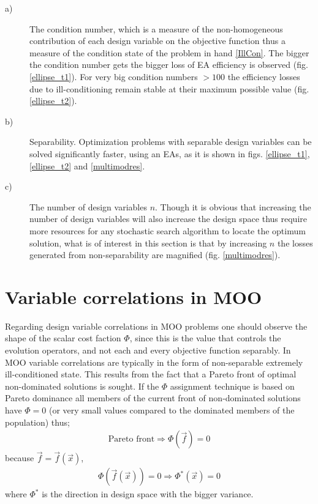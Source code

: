 \begin{description}
  \item[a)] The condition number, which is a measure of the non-homogeneous contribution of each design variable on the objective function thus a measure of the condition state of the problem in hand \ref{IllCon}. The bigger the condition number gets the bigger loss of EA efficiency is observed (fig. \ref{ellipse_t1}). For very big condition numbers $>100$ the efficiency losses due to ill-conditioning remain stable at their maximum possible value (fig. \ref{ellipse_t2}).    
  \item[b)] Separability. Optimization problems with separable design variables can be solved significantly faster, using an EAs, as it is shown in figs. \ref{ellipse_t1}, \ref{ellipse_t2} and \ref{multimodres}.  
  \item[c)] The number of design variables $n$. Though it is obvious that increasing the number of design variables will also increase the design space thus require more resources for any stochastic search algorithm to locate the optimum solution, what is of interest in this section is that by increasing $n$ the losses generated from non-separability are magnified (fig. \ref{multimodres}).  
\end{description}
\section{Variable correlations in MOO}
\label{VCMM}
Regarding design variable correlations in MOO problems one should observe the shape of the scalar cost faction $\Phi$, since this is the value that controls the evolution operators, and not each and every objective function separably. In MOO variable correlations are typically in the form of non-separable extremely ill-conditioned state. This results from the fact that a Pareto front of optimal non-dominated solutions is sought. If the $\Phi$ assignment technique is based on Pareto dominance all members of the current front of non-dominated solutions have $\Phi=0$ (or very small values compared to the dominated members of the population) thus;
\begin{eqnarray}
   \mbox{Pareto front} \Rightarrow 	\Phi(\vec{f})=0  
   \label{Corr-Par} 
\end{eqnarray}
because $\vec{f}=\vec{f}(\vec{x})$,
\begin{eqnarray}
	\Phi(\vec{f}(\vec{x}))=0 \Rightarrow \Phi^*(\vec{x})=0
    \label{Corr-Par2}
\end{eqnarray}
where $\Phi^*$ is the direction in design space with the bigger variance.

